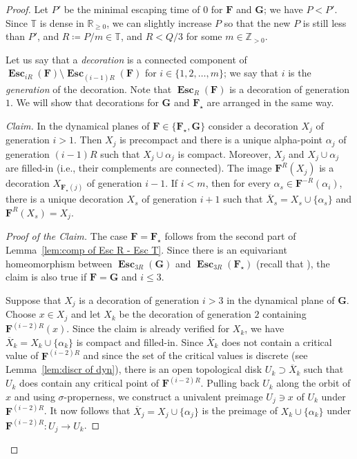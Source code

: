 \documentclass{amsart}
\newcommand{\1}{{\mathbb 1 }}
\newcommand\PT{\mathbb{ T}}
\newcommand{\bF}{{\mathbf F}}
\newcommand{\bG}{{\mathbf G}}
\newcommand{\str}{{\star}}
\newcommand{\R}{\mathbb{R}}
\newcommand{\Z}{\mathbb{Z}}
\theoremstyle{remark}
\numberwithin{equation}{section}
\theoremstyle{definition}
\newcommand{\Esc}{{\boldsymbol{\operatorname{Esc}}}}
\theoremstyle{nonumberbreak}
\begin{document}
\begin{proof}
Let $P'$ be the minimal escaping time of $0$ for $\bF$ and $\bG$; we have $P<P'$. Since $\PT$ is dense in $\R_{\ge0}$, we can slightly increase $P$ so that the new $P$ is still less than $P'$, and $R\coloneqq P/m \in \PT$, and $R<Q/3$ for some $m\in \Z_{>0}$.



Let us say that a \emph{decoration} is a connected component of $\Esc_{iR}(\bF)\setminus \Esc_{(i-1)R}(\bF)$ for $i\in \{1,2,\dots ,m\}$; we say that $i$ is the \emph{generation} of the decoration. Note that $\Esc_R(\bF)$ is a decoration of generation $1$. We will show that decorations for $\bG$ and $\bF_\str$ are arranged in the same way.

\emph{Claim.} In the dynamical planes of $\bF\in \{\bF_\str, \bG\}$ consider  a decoration $X_j$ of generation $i>1$. Then $X_j$ is precompact and there is a unique alpha-point $\alpha_j$ of generation $(i-1)R$ such that $X_j\cup \alpha_j$ is compact. Moreover, $X_j$ and $X_j\cup \alpha_j$ are filled-in (i.e., their complements are connected). The image $\bF^R(X_j)$ is a decoration $X_{\bF_\str(j)}$ of generation $i-1$. If $i<m$, then for every $\alpha_s\in \bF^{-R}(\alpha_i)$, there is a unique decoration $X_s$ of generation $i+1$ such that $\overline X_s=X_s\cup \{\alpha_s\}$ and $\bF^R (X_s) =X_j$.
\begin{proof}[Proof of the Claim]
The case $\bF=\bF_\str$ follows from the second part of Lemma~\ref{lem:comp of Esc R - Esc T}. Since there is an equivariant homeomorphism between $\Esc_{3R}(\bG)$ and $\Esc_{3R}(\bF_\str)$ (recall that ), the claim is also true if $\bF=\bG$ and $i\le 3$.

Suppose that  $X_j$ is a decoration of generation $i>3$ in the dynamical plane of $\bG$. Choose $x\in X_j$ and let $X_k$ be the decoration of generation $2$ containing $\bF^{(i-2)R}(x)$. Since the claim is already verified for $X_k$, we have $\overline X_k=X_k\cup \{\alpha_k\}$ is compact and filled-in. Since $\overline X_k$  does not contain a critical value of $\bF^{(i-2)R}$ and since the set of the critical values is discrete (see Lemma~\ref{lem:discr of dyn}), there is an open topological disk $U_k\supset \overline X_k$ such that $U_k$ does contain any critical point of $\bF^{(i-2)R}$. Pulling back  $U_k$ along the orbit of $x$ and using $\sigma$-properness, we construct a univalent preimage $U_j\ni x$ of $U_k$ under $\bF^{(i-2)R}$. It now follows that $\overline X_j=X_j\cup \{\alpha_j\}$ is the preimage of $X_k\cup \{\alpha_k\}$ under $\bF^{(i-2)R}\colon U_j\to U_k$.


\end{proof}
\end{proof}
\end{document}
